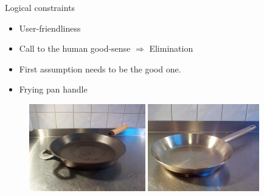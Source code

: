 \documentclass{beamer}
\begin{document}
\begin{frame}{Logical constraints}
    \begin{itemize}
    		\item User-friendliness
    		\item Call to the human good-sense $\Rightarrow$ Elimination
    		\item First assumption  needs to be the good one.
    		\item Frying pan handle
    \end{itemize}
  
        \begin{figure}[h]
        \centering
        \includegraphics[width=0.45\textwidth]{frying-pan-2handles.jpg}
        \includegraphics[width=0.43\textwidth]{frying-pan-1handle.jpg}
        \end{figure}
\end{frame}
\end{document}

